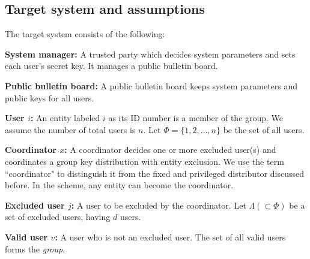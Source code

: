 \documentclass{ims9x6}
\begin{document}
\subsection{Target system and assumptions}
The target system consists of the following:
\begin{description}
\item {\bf System manager:} A trusted party which decides system
parameters and sets each user's secret key. It manages a public
bulletin board.
\item {\bf Public bulletin board:} A public bulletin board keeps
system parameters and public keys for all users.
\item {\bf User \boldmath${i}$:} An entity labeled $i$ as its ID
number is a member of the group. We assume the number of total users
is $n$. Let $\Phi=\{1,2,\ldots,n\}$ be the set of all users.
\item {\bf Coordinator \boldmath${x}$:} A coordinator decides one or
more excluded user(s) and coordinates a group key distribution with
entity exclusion. We use the term ``coordinator" to distinguish it
from the fixed and privileged distributor discussed before. In the
scheme, any entity can become the coordinator.
\item {\bf Excluded user \boldmath$j$:} A user to be excluded by the
coordinator. Let $\Lambda(\subset\Phi)$ be a set of excluded users,
having $d$ users.
\item {\bf Valid user \boldmath$v$:} A user who is not an excluded
user. The set of all valid users forms the {\em group}.
\end{description}
\end{document}
